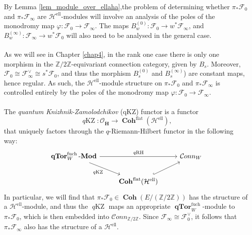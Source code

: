 \documentclass[a4paper]{report}
\theoremstyle{theorem}
\theoremstyle{definition}
\theoremstyle{remark}
\theoremstyle{proposition}
\theoremstyle{conjecture}
\theoremstyle{lemma}
\theoremstyle{corollary}
\theoremstyle{exercise}
\theoremstyle{example}
\newcommand{\mcal}{\mathcal}
\newcommand{\on}{\operatorname}
\newcommand{\coh}{\on{\mathbf{Coh}}}
\newcommand{\lmod}{\on{\mathbf{-Mod}}}
\newcommand{\qTor}{\on{\mathbf{qTor}}}
\newcommand{\qKZ}{\on{\mathit{q}KZ}}
\newcommand{\qRH}{\on{\mathit{q}RH}}
\begin{document}
  By Lemma \ref{lem_module_over_ellaha},the problem of determining whether $\pi_\ast\mcal{F}_0$ and $\pi_\ast\mcal{F}_\infty$ 
  are $\mcal{H}^{\on{ell}}$-modules will involve an analysis of the poles of the monodromy map $\varphi : \mcal{F}_0 \to \mcal{F}_\infty$. 
  The maps $B_w^{(0)} : \mcal{F}_0 \to w^\ast\mcal{F}_\infty$, and $B_w^{(\infty)} : \mcal{F}_\infty \to w^\ast\mcal{F}_0$ 
  will also need to be analysed in the general case.\\\\
  As we will see in Chapter \ref{chap4}, in the rank one case there is only 
  one morphism in the $\mathbb{Z}/2\mathbb{Z}$-equivariant connection category, given by $B_s$. Moreover, 
  $\mcal{F}_0 \cong \mcal{F}_\infty^\vee \cong s^\ast\mcal{F}_0$, and thus the morphism $B_s^{(0)}$ and
  $B_s^{(\infty)}$) are constant maps, hence regular. As such, the $\mcal{H}^{\on{ell}}$-module 
  structure on $\pi_\ast\mcal{F}_0$ and $\pi_\ast\mcal{F}_\infty$ is controlled entirely by the poles of the monodromy map 
  $\varphi : \mcal{F}_0 \to \mcal{F}_\infty$.\\\\
  The \emph{quantum Knizhnik-Zamolodchikov} (qKZ) functor is a functor 
  $$\qKZ : \mcal{O}_{\mathbf{\ddot{\mathbf{H}}}} \longrightarrow \coh^{\on{flat}}(\mcal{H}^{\on{ell}}),$$ 
  that uniquely factors through the $q$-Riemann-Hilbert functor in the following way:
  $$\begin{tikzcd}
      \qTor^{\on{fuch}}_W\lmod \arrow[rr, "\qRH"] \arrow[rd, "\qKZ"'] &                                                        & \mcal{C}onn_W \\
                                                                      & \coh^{\on{flat}}(\mcal{H}^{\on{ell}}) \arrow[ru, hook] &              
  \end{tikzcd}$$
  In particular, we will find that $\pi_\ast\mcal{F}_0 \in \coh(E/(\mathbb{Z}/2\mathbb{Z}))$ has the structure of a 
  $\mcal{H}^{\on{ell}}$-module, and thus the $\qKZ$ maps an appropriate $\qTor_W^{\on{fuch}}$-module to $\pi_\ast\mcal{F}_0$, 
  which is then embedded into $\mcal{C}onn_{\mathbb{Z}/2\mathbb{Z}}$. Since $\mcal{F}_\infty \cong \mcal{F}_0^\vee$, it follows that 
  $\pi_\ast\mcal{F}_\infty$ also has the structure of a $\mcal{H}^{\on{ell}}$.\\\\
\end{document}
